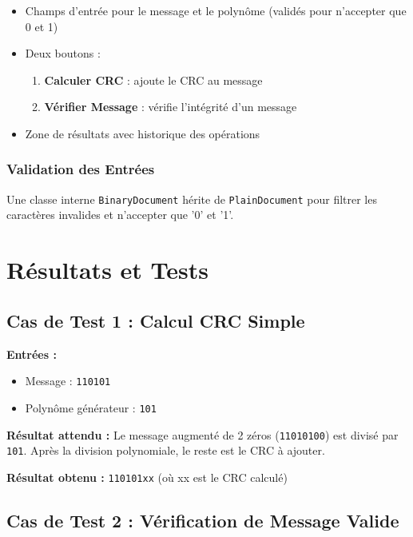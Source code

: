 \documentclass[12pt, a4paper]{article}
\begin{document}
\begin{itemize}
    \item Champs d'entrée pour le message et le polynôme (validés pour n'accepter que 0 et 1)
    \item Deux boutons :
    \begin{enumerate}
        \item \textbf{Calculer CRC} : ajoute le CRC au message
        \item \textbf{Vérifier Message} : vérifie l'intégrité d'un message
    \end{enumerate}
    \item Zone de résultats avec historique des opérations
\end{itemize}

\subsubsection{Validation des Entrées}

Une classe interne \texttt{BinaryDocument} hérite de \texttt{PlainDocument} pour filtrer les caractères invalides et n'accepter que '0' et '1'.

\section{Résultats et Tests}

\subsection{Cas de Test 1 : Calcul CRC Simple}

\textbf{Entrées :}
\begin{itemize}
    \item Message : \texttt{110101}
    \item Polynôme générateur : \texttt{101}
\end{itemize}

\textbf{Résultat attendu :} 
Le message augmenté de 2 zéros (\texttt{11010100}) est divisé par \texttt{101}.
Après la division polynomiale, le reste est le CRC à ajouter.

\textbf{Résultat obtenu :} \texttt{110101xx} (où xx est le CRC calculé)

\subsection{Cas de Test 2 : Vérification de Message Valide}
\end{document}
